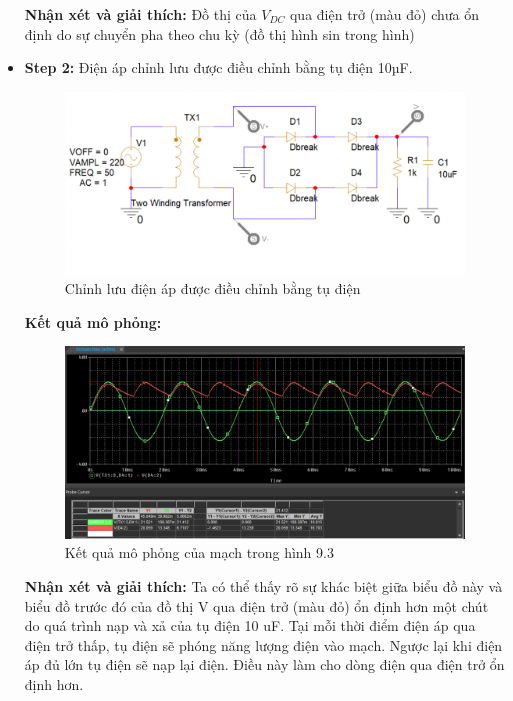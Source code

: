 \begin{itemize}
    \textbf{Nhận xét và giải thích:} Đồ thị của \(V_{DC}\) qua điện trở (màu đỏ) chưa ổn định do sự chuyển pha theo chu kỳ (đồ thị hình sin trong hình)
    
    \item \textbf{Step 2:} Điện áp chỉnh lưu được điều chỉnh bằng tụ điện 10µF.
    
    \begin{figure}[ht]
        \centering
        \includegraphics[scale= 0.26]{graphics/ex9/f3.png}
        \caption{Chỉnh lưu điện áp được điều chỉnh bằng tụ điện}
    \end{figure}
\pagebreak
    \textbf{Kết quả mô phỏng: }

    \begin{figure}[ht]
        \centering
        \includegraphics[scale= 0.2]{graphics/ex9/f4.png}
        \caption{Kết quả mô phỏng của mạch trong hình 9.3}
    \end{figure}
    
    \textbf{Nhận xét và giải thích:} Ta có thể thấy rõ sự khác biệt giữa biểu đồ này và biểu đồ trước đó của đồ thị V qua điện trở (màu đỏ) ổn định hơn một chút do quá trình nạp và xả của tụ điện 10 uF. Tại mỗi thời điểm điện áp qua điện trở thấp, tụ điện sẽ phóng năng lượng điện vào mạch. Ngược lại khi điện áp đủ lớn tụ điện sẽ nạp lại điện. Điều này làm cho dòng điện qua điện trở ổn định hơn.
    

\end{itemize}
